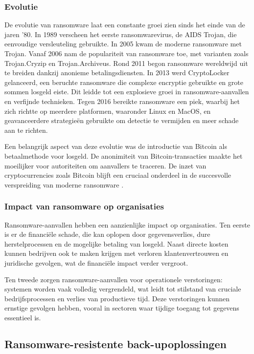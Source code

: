 \subsubsection{Evolutie}
De evolutie van ransomware laat een constante groei zien sinds het einde van de jaren '80. In 1989 verscheen het eerste ransomwarevirus, de AIDS Trojan, die eenvoudige versleuteling gebruikte. In 2005 kwam de moderne ransomware met Trojan. Vanaf 2006 nam de populariteit van ransomware toe, met varianten zoals Trojan.Cryzip en Trojan.Archiveus. Rond 2011 begon ransomware wereldwijd uit te breiden dankzij anonieme betalingsdiensten. In 2013 werd CryptoLocker gelanceerd, een beruchte ransomware die complexe encryptie gebruikte en grote sommen losgeld eiste. Dit leidde tot een explosieve groei in ransomware-aanvallen en verfijnde technieken. Tegen 2016 bereikte ransomware een piek, waarbij het zich richtte op meerdere platformen, waaronder Linux en MacOS, en geavanceerdere strategieën gebruikte om detectie te vermijden en meer schade aan te richten. 

Een belangrijk aspect van deze evolutie was de introductie van Bitcoin als betaalmethode voor losgeld. De anonimiteit van Bitcoin-transacties maakte het moeilijker voor autoriteiten om aanvallers te traceren. De inzet van cryptocurrencies zoals Bitcoin blijft een cruciaal onderdeel in de succesvolle verspreiding van moderne ransomware \autocite{Richardson2017}.

\subsubsection{Impact van ransomware op organisaties}
Ransomware-aanvallen hebben een aanzienlijke impact op organisaties. Ten eerste is er de financiële schade, die kan oplopen door gegevensverlies, dure herstelprocessen en de mogelijke betaling van losgeld. Naast directe kosten kunnen bedrijven ook te maken krijgen met verloren klantenvertrouwen en juridische gevolgen, wat de financiële impact verder vergroot. 

Ten tweede zorgen ransomware-aanvallen voor operationele verstoringen: systemen worden vaak volledig vergrendeld, wat leidt tot stilstand van cruciale bedrijfsprocessen en verlies van productieve tijd. Deze verstoringen kunnen ernstige gevolgen hebben, vooral in sectoren waar tijdige toegang tot gegevens essentieel is.

\subsection{Ransomware-resistente back-upoplossingen}
